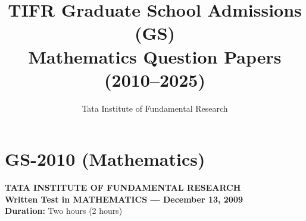 \documentclass[11pt, a4paper]{article}
\title{\textbf{TIFR Graduate School Admissions (GS)}\\Mathematics Question Papers (2010--2025)}
\author{Tata Institute of Fundamental Research}
\date{}
\begin{document}
\maketitle
\tableofcontents
\newpage

\section{GS-2010 (Mathematics)}

\begin{center}
  \textbf{TATA INSTITUTE OF FUNDAMENTAL RESEARCH}\\
  \textbf{Written Test in MATHEMATICS --- December 13, 2009}\\
  \textbf{Duration:} Two hours (2 hours)
\end{center}
\end{document}
